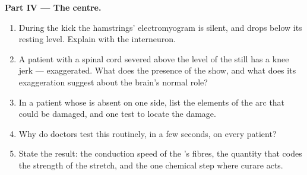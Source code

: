 \begin{problem}
\medskip
\noindent\textbf{Part IV --- The centre.}
\begin{enumerate}[resume]
  \item During the kick the hamstrings' electromyogram is silent, and
        drops below its resting level. Explain with the interneuron.
  \item A patient with a spinal cord severed above the level of the
         still has a knee jerk --- exaggerated. What does the
        presence of the  show, and what does its exaggeration
        suggest about the brain's normal role?
  \item In a patient whose  is absent on one side, list the
        elements of the arc that could be damaged, and one test to
        locate the damage.
  \item Why do doctors test this  routinely, in a few seconds,
        on every patient?
  \item State the result: the conduction speed of the 's fibres,
        the quantity that codes the strength of the stretch, and the
        one chemical step where curare acts.
\end{enumerate}
\end{problem}
